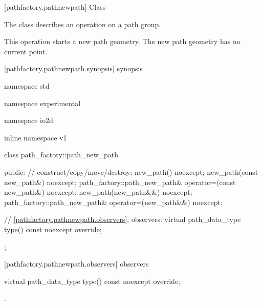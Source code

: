  [pathfactory.pathnewpath] {Class }

\pnum
{}
The class  describes an operation on a path group.

\pnum
This operation starts a new path geometry. The new path geometry has no current point.

 [pathfactory.pathnewpath.synopsis] { synopsis}

\begin{codeblock}
namespace std { namespace experimental { namespace io2d { inline namespace v1 {
  class path_factory::path_new_path {
  public:
    // construct/copy/move/destroy:
    new_path() noexcept;
    new_path(const new_path&) noexcept;
    path_factory::path_new_path& operator=(const new_path&) noexcept;
    new_path(new_path&&) noexcept;
    path_factory::path_new_path& operator=(new_path&&) noexcept;

    // \ref{pathfactory.pathnewpath.observers}, observers:
    virtual path_data_type type() const noexcept override;
  };
} } } }
\end{codeblock}

 [pathfactory.pathnewpath.observers]{ observers}

\begin{itemdecl}
    virtual path_data_type type() const noexcept override;
\end{itemdecl}
\begin{itemdescr}
	\pnum
	\returns
	.

\end{itemdescr}
